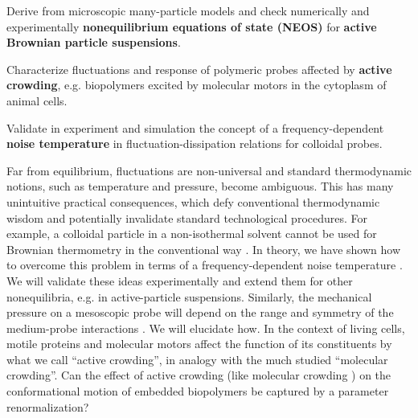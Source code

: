 \begin{workpackage}[id=WPactive,wphases=0-48,
  short=Active Particle Suspensions,%
  title=Probing active particle suspensions with colloids and polymers,
  lead=ULEI,
  ULEIRM=96,UNIPDRM=6,USTUTTRM=2]

\newrefsection

\begin{mdframed}
\mobjectives
%
  \begin{compactitem}
  \item Derive from microscopic many-particle models and check numerically and experimentally 
  \textbf{nonequilibrium equations of state (NEOS)} for  \textbf{active Brownian particle suspensions}.
  \item Characterize fluctuations and response of polymeric probes affected by \textbf{active
    crowding}, e.g. biopolymers excited by molecular motors in the cytoplasm of animal cells.
  \item Validate in experiment and simulation the concept of a frequency-dependent \textbf{noise temperature} 
  in fluctuation-dissipation relations for colloidal probes.
  \end{compactitem}

\mdescription
%
Far from equilibrium, fluctuations are non-universal and standard thermodynamic notions,
such as temperature and pressure, become ambiguous. 
This has many unintuitive practical consequences, which defy conventional thermodynamic
wisdom and potentially invalidate standard technological procedures.
%
For example, a colloidal particle in a non-isothermal solvent cannot be used for Brownian thermometry 
in the conventional way \cite{rings-etal:2010,kroy:2014}. In theory, we have shown how to overcome this problem
in terms of a frequency-dependent noise temperature \cite{falasco-etal:2014}.
%
We will validate these ideas experimentally and extend them for other
nonequilibria, e.g. in active-particle suspensions.
%
Similarly, the mechanical pressure on a mesoscopic probe will depend on the range and symmetry 
of the medium-probe interactions \cite{solon-etal:2015}. We will elucidate how. 
%
In the context of living cells, motile proteins and molecular motors affect the function
of its constituents by what  we call ``active crowding'', in analogy with the much studied ``molecular crowding''.
%
Can the effect of active crowding (like molecular crowding \cite{schoebl-etal:2014}) on the conformational motion 
of embedded biopolymers be captured by a parameter renormalization?  
\end{mdframed}


\end{workpackage}
